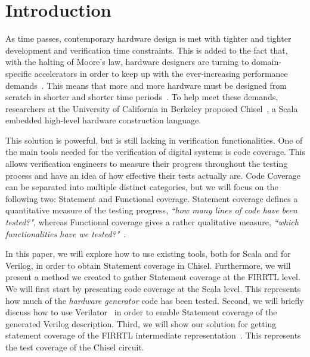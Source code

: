 \documentclass[conference]{IEEEtran}
\newcommand{\martin}[1]{{\color{blue} Martin: #1}}
\begin{document}

\section{Introduction}
\label{sec:objectives}
As time passes, contemporary hardware design is met with tighter and tighter development and verification time constraints. This is added to the fact that, with the halting of Moore's law, hardware designers are turning to domain-specific accelerators in order to keep up with the ever-increasing performance demands~\cite{henn-patt:turing:2019}. This means that more and more hardware must be designed from scratch in shorter and shorter time periods~\cite{domain-hw-acc:2020}.  To help meet these demands, researchers at the University of California in Berkeley proposed Chisel~\cite{chisel:dac2012}, a Scala embedded high-level hardware construction language.

This solution is powerful, but is still lacking in verification functionalities. One of the main tools needed for the verification of digital systems is code coverage. This allows verification engineers to measure their progress throughout the testing process and have an idea of how effective their tests actually are. Code Coverage can be separated into multiple distinct categories, but we will focus on the following two: Statement and Functional coverage. Statement coverage defines a quantitative measure of the testing progress, \textit{``how many lines of code have been tested?"}, whereas Functional coverage gives a rather qualitative measure, \textit{``which functionalities have we tested?"}~\cite{spear2008systemverilog}.


In this paper, we will explore how to use existing tools, both for Scala and for Verilog, in order to obtain Statement coverage in Chisel. Furthermore, we will present a method we created to gather Statement coverage at the FIRRTL level. We will first start by presenting code coverage at the Scala level. This represents how much of the \emph{hardware generator} code has been tested. 
Second, we will briefly discuss how to use Verilator~\cite{verilator} in order to enable Statement coverage of the generated Verilog description. Third, we will show our solution for getting statement coverage of the FIRRTL intermediate representation~\cite{firrtl}. This represents the test coverage of the Chisel circuit.
\end{document}
